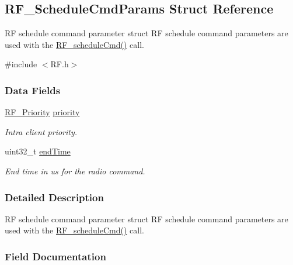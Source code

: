 \subsection{R\+F\+\_\+\+Schedule\+Cmd\+Params Struct Reference}
\label{struct_r_f___schedule_cmd_params}


R\+F schedule command parameter struct R\+F schedule command parameters are used with the \hyperlink{_r_f_8h_a5e7f25943b5f3942bf4c09cb87f9aa76}{R\+F\+\_\+schedule\+Cmd()} call.  




{\ttfamily \#include $<$R\+F.\+h$>$}

\subsubsection*{Data Fields}
\begin{DoxyCompactItemize}
\item 
\hyperlink{_r_f_8h_ae5f9a893d178e64e6d0a7a783ea06e32}{R\+F\+\_\+\+Priority} \hyperlink{struct_r_f___schedule_cmd_params_a809078fc59bdf91f81ef390da0047537}{priority}
\begin{DoxyCompactList}\small\item\em Intra client priority. \end{DoxyCompactList}\item 
uint32\+\_\+t \hyperlink{struct_r_f___schedule_cmd_params_ae4244a807352c8c93def2d39bbbd080e}{end\+Time}
\begin{DoxyCompactList}\small\item\em End time in us for the radio command. \end{DoxyCompactList}\end{DoxyCompactItemize}


\subsubsection{Detailed Description}
R\+F schedule command parameter struct R\+F schedule command parameters are used with the \hyperlink{_r_f_8h_a5e7f25943b5f3942bf4c09cb87f9aa76}{R\+F\+\_\+schedule\+Cmd()} call. 

\subsubsection{Field Documentation}
